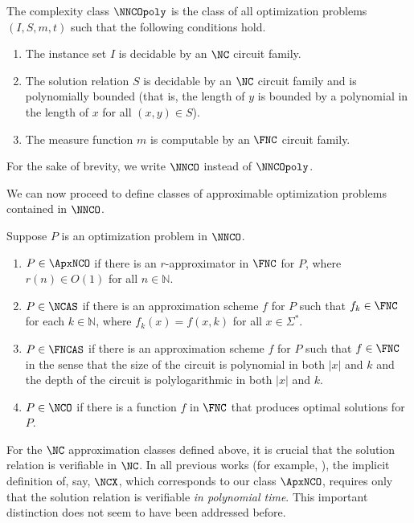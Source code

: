 \begin{definition}\label{def:nnco}
  The complexity class $\NNCOpoly$ is the class of all optimization problems $(I, S, m, t)$ such that the following conditions hold.
  \begin{enumerate}
  \item The instance set $I$ is decidable by an $\NC$ circuit family.
  \item The solution relation $S$ is decidable by an $\NC$ circuit family and is polynomially bounded (that is, the length of $y$ is bounded by a polynomial in the length of $x$ for all $(x, y)\in S$).
  \item The measure function $m$ is computable by an $\FNC$ circuit family.
  \end{enumerate}
  For the sake of brevity, we write $\NNCO$ instead of $\NNCOpoly$.
\end{definition}

We can now proceed to define classes of approximable optimization problems contained in $\NNCO$.

\begin{definition}\label{def:ncx}
  Suppose $P$ is an optimization problem in $\NNCO$.
  \begin{enumerate}
  \item $P \in \ApxNCO$ if there is an $r$-approximator in $\FNC$ for $P$, where $r(n) \in O(1)$ for all $n \in \mathbb{N}$.
  \item $P \in \NCAS$ if there is an approximation scheme $f$ for $P$ such that $f_k \in \FNC$ for each $k \in \mathbb{N}$, where $f_k(x) = f(x, k)$ for all $x \in \Sigma^*$.
  \item $P \in \FNCAS$ if there is an approximation scheme $f$ for $P$ such that $f \in \FNC$ in the sense that the size of the circuit is polynomial in both $|x|$ and $k$ and the depth of the circuit is polylogarithmic in both $|x|$ and $k$.
  \item $P \in \NCO$ if there is a function $f$ in $\FNC$ that produces optimal solutions for $P$.
  \end{enumerate}
\end{definition}

For the $\NC$ approximation classes defined above, it is crucial that the solution relation is verifiable in $\NC$.
In all previous works (for example, \cite{dsst97, sx95}), the implicit definition of, say, $\NCX$, which corresponds to our class $\ApxNCO$, requires only that the solution relation is verifiable \emph{in polynomial time}.
This important distinction does not seem to have been addressed before.

